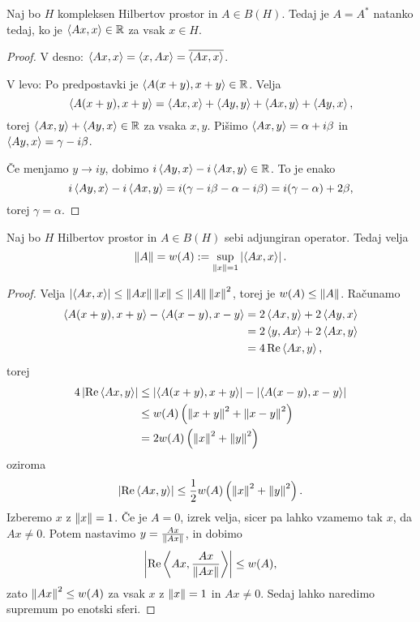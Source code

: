 \begin{trditev}
  Naj bo $H$ kompleksen Hilbertov prostor in $A \in B(H)$.
  Tedaj je $A = A^*$ natanko tedaj, ko je $\left< Ax,x \right> \in \mathbb{R}$ za vsak $x \in H$.
\end{trditev}

\begin{proof}
  V desno: $\left< Ax,x \right> = \left< x,Ax \right>= \overline{\left< Ax, x \right>}$.

  V levo:
  Po predpostavki je $\left< A(x+y), x+y \right> \in \mathbb{R}$.
  Velja
  \[
	\left< A(x+y), x+y \right> = \left< Ax, x \right> + \left< Ay,y \right> + \left< Ax,y \right> + \left< Ay,x \right>,
  \]
  torej $\left< Ax,y \right> + \left< Ay,x \right> \in \mathbb{R}$ za vsaka $x,y$.
  Pišimo $\left< Ax,y \right> = \alpha + i \beta$ in $\left< Ay,x \right> = \gamma - i \beta$.

  Če menjamo $y \to i y$, dobimo $i \left< Ay, x \right> - i \left< Ax,y \right> \in \mathbb{R}$.
  To je enako
  \[
	i \left< Ay, x \right> - i \left< Ax,y \right>
	= i(\gamma - i \beta - \alpha - i \beta)
	= i(\gamma - \alpha) + 2 \beta,
  \]
  torej $\gamma = \alpha$.
\end{proof}

\begin{izrek}
  Naj bo $H$ Hilbertov prostor in $A \in B(H)$ sebi adjungiran operator.
  Tedaj velja
  \[
	\left\lVert A\right\rVert = w(A) := \sup_{\left\lVert x\right\rVert = 1} \left| \left< Ax,x \right> \right|.
  \]
\end{izrek}

\begin{proof}
  Velja $\left| \left< Ax,x \right> \right| \le \left\lVert Ax\right\rVert \left\lVert x\right\rVert \le \left\lVert A\right\rVert \left\lVert x\right\rVert^2$, torej
  je $w(A) \le \left\lVert A\right\rVert$.
  Računamo
  \begin{align*}
	\left< A(x+y), x+y \right> - \left< A(x-y), x-y \right>
	&= 2 \left< Ax,y \right> + 2 \left< Ay,x \right> \\
	&= 2 \left< y,Ax \right> + 2 \left< Ax,y \right> \\
	&= 4 \operatorname{Re} \left< Ax,y \right>,
  \end{align*}
  torej
  \begin{align*}
	4 \left| \operatorname{Re} \left< Ax,y \right> \right|
	&\le \left| \left< A(x+y), x+y \right> \right| - \left| \left< A(x-y), x-y \right> \right| \\
	&\le w(A) \left( \left\lVert x+y\right\rVert^2 + \left\lVert x-y\right\rVert^2 \right) \\
	&= 2 w(A) \left( \left\lVert x\right\rVert^2 + \left\lVert y\right\rVert^2 \right)
  \end{align*}
  oziroma
  \[
	\left| \operatorname{Re} \left< Ax,y \right> \right| \le \frac{1}{2} w(A) \left( \left\lVert x\right\rVert^2 + \left\lVert y\right\rVert^2 \right).
  \]
  Izberemo $x$ z $\left\lVert x\right\rVert = 1$.
  Če je $A = 0$, izrek velja, sicer pa lahko vzamemo tak $x$, da $Ax \ne 0$.
  Potem nastavimo $y = \frac{Ax}{\left\lVert Ax\right\rVert}$, in dobimo
  \[
	\left| \operatorname{Re} \left< Ax, \frac{Ax}{\left\lVert Ax\right\rVert} \right> \right| \le w(A),
  \]
  zato $\left\lVert Ax\right\rVert^2 \le w(A)$ za vsak $x$ z $\left\lVert x\right\rVert = 1$ in $Ax \ne 0$.
  Sedaj lahko naredimo supremum po enotski sferi.
\end{proof}

